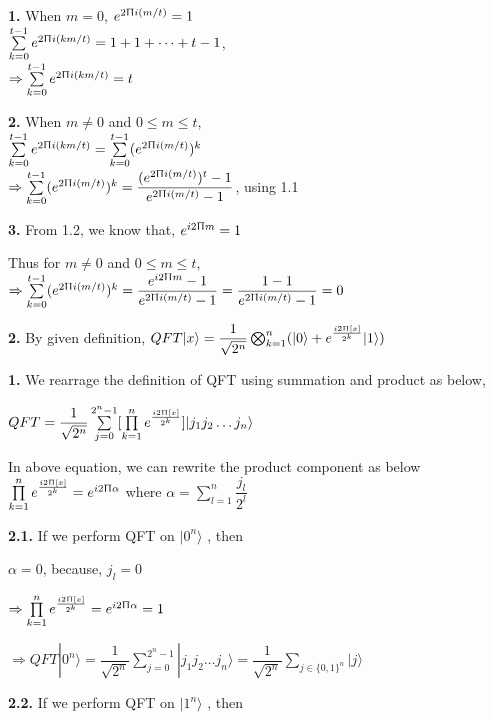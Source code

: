 \documentclass [12pt]{article}
\theoremstyle{definition}
\newcommand{\ket}[1]{| {#1} \rangle}
\newcommand{\suml}[2]{\sum\limits_{#1}^{#2}}
\begin{document}
\phantom{1em} {\bf 1.} When $m = 0$, $e^{2\Uppi i(m/t)} = 1$\\
\phantom{1000em} $\suml{k=0}{t-1} e^{2\Uppi i(km/t)} = 1 + 1 + \dots + t-1$, \\
\phantom{1000em} $\Rightarrow \suml{k=0}{t-1} e^{2\Uppi i(km/t)} = t$

\phantom{1em} {\bf 2.} When $m \neq 0$ and $0 \leq m \leq t$,\\
\phantom{1000em} $\suml{k=0}{t-1} e^{2\Uppi i(km/t)} = \suml{k=0}{t-1} (e^{2\Uppi i(m/t)})^{k}$\\
\phantom{1000em} $\Rightarrow \suml{k=0}{t-1} (e^{2\Uppi i(m/t)})^{k} = \dfrac{(e^{2\Uppi i(m/t)})^{t} - 1}{e^{2\Uppi i(m/t)} - 1}$, using 1.1

\phantom{1em} {\bf 3.} From 1.2, we know that, $e^{i 2\Uppi m} = 1$

\phantom{1000em} Thus for $m \neq 0$ and $0 \leq m \leq t$,\\
\phantom{1000em} $\Rightarrow \suml{k=0}{t-1} (e^{2\Uppi i(m/t)})^{k} = \dfrac{e^{i2\Uppi m} - 1}{e^{2\Uppi i(m/t)} - 1} = \dfrac{1 - 1}{e^{2\Uppi i(m/t)} - 1} = 0$

{\bf 2.} By given definition, $QFT\ket{x} = \dfrac{1}{\sqrt{2^{n}}} \bigotimes_{k=1}^{n}(\ket{0} + e^{\frac{i2\Uppi [x]}{2^{k}}}\ket{1})$ 

\phantom{1em} {\bf 1.} We rearrage the definition of QFT using summation and product as below,

\phantom{1000em} $QFT = \dfrac{1}{\sqrt{2^{n}}} \suml{j=0}{2^{n} - 1}[ \prod\limits_{k=1}^{n} e^{\frac{i2\Uppi [x]}{2^{k}}}] \ket{j_{1} j_{2} \dots j_{n}}$

\phantom{1000em} In above equation, we can rewrite the product component as below \\
\phantom{1000em} $\prod\limits_{k=1}^{n} e^{\frac{i2\Uppi [x]}{2^{k}}} = e^{i2\Uppi \alpha}$ where $\alpha = \suml{l=1}{n} \dfrac{j_{l}}{2^{l}}$

\phantom{1em} {\bf 2.1.} If we perform QFT on $\ket{0^{n}}$ , then 

\phantom{1000em} $\alpha = 0$, because, $j_{l} = 0$

\phantom{1000em} $\Rightarrow \prod\limits_{k=1}^{n} e^{\frac{i2\Uppi [x]}{2^{k}}} = e^{i2\Uppi \alpha} = 1$

\phantom{1000em} $\Rightarrow QFT\ket{0^{n}} =  \dfrac{1}{\sqrt{2^{n}}} \suml{j=0}{2^{n} - 1} \ket{j_{1} j_{2} \dots j_{n}} = \dfrac{1}{\sqrt{2^{n}}} \suml{j \in \{0,1\}^{n}}{ } \ket{j}$

\phantom{1em} {\bf 2.2.} If we perform QFT on $\ket{1^{n}}$ , then
\end{document}
